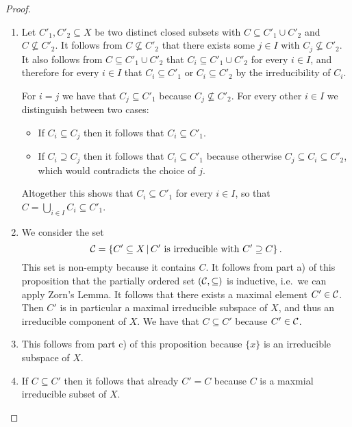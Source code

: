 \begin{proof}
  \leavevmode
  \begin{enumerate}
    \item
      Let $C'_1, C'_2 \subseteq X$ be two distinct closed subsets with $C \subseteq C'_1 \cup C'_2$ and $C \nsubseteq C'_2$.
      It follows from $C \nsubseteq C'_2$ that there exists some $j \in I$ with $C_j \nsubseteq C'_2$.
      It also follows from $C \subseteq C'_1 \cup C'_2$ that $C_i \subseteq C'_1 \cup C'_2$ for every $i \in I$, and therefore for every $i \in I$ that $C_i \subseteq C'_1$ or $C_i \subseteq C'_2$ by the irreducibility of $C_i$.
      
      For $i = j$ we have that $C_j \subseteq C'_1$ because $C_j \nsubseteq C'_2$.
      For every other $i \in I$ we distinguish between two cases:
      \begin{itemize}
        \item
          If $C_i \subseteq C_j$ then it follows that $C_i \subseteq C'_1$.
        \item
          If $C_i \supseteq C_j$ then it follows that $C_i \subseteq C'_1$ because otherwise $C_j \subseteq C_i \subseteq C'_2$, which would contradicts the choice of $j$.
      \end{itemize}
      Altogether this shows that $C_i \subseteq C'_1$ for every $i \in I$, so that $C = \bigcup_{i \in I} C_i \subseteq C'_1$.
    \item
      We consider the set
      \[
          \mc{C}
        = \{
            C' \subseteq X
          \suchthat
            \text{$C'$ is irreducible with $C' \supseteq C$}
          \} \,.
      \]
      This set is non-empty because it contains $C$.
      It follows from part a) of this proposition that the partially ordered set $(\mathcal{C},\subseteq)$ is inductive, i.e.\ we can apply Zorn’s Lemma.
      It follows that there exists a maximal element $C' \in \mathcal{C}$.
      Then $C'$ is in particular a maximal irreducible subspace of $X$, and thus an irreducible component of $X$.
      We have that $C \subseteq C'$ because $C' \in \mathcal{C}$.
    \item
      This follows from part c) of this proposition because $\{x\}$ is an irreducible subspace of $X$.
    \item
      If $C \subseteq C'$ then it follows that already $C' = C$ because $C$ is a maxmial irreducible subset of $X$.
    \qedhere
  \end{enumerate}
\end{proof}



